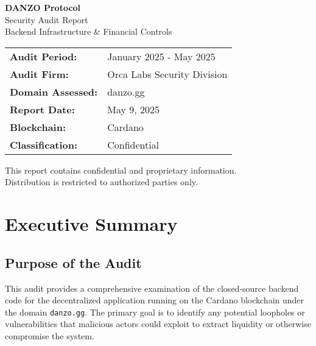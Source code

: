 \documentclass[11pt,a4paper]{article}
\begin{document}
\begin{titlepage}
    \centering
    \vspace*{2cm}
    
    {\Huge\bfseries\color{danzoBlue} DANZO Protocol}\\[0.5cm]
    {\LARGE\color{danzoGray} Security Audit Report}\\[2cm]
    
    {\Large Backend Infrastructure \& Financial Controls}\\[1cm]
    
    \begin{tabular}{ll}
        \textbf{Audit Period:} & January 2025 - May 2025 \\
        \textbf{Audit Firm:} & Orca Labs Security Division \\
        \textbf{Domain Assessed:} & danzo.gg \\
        \textbf{Report Date:} & May 9, 2025 \\
        \textbf{Blockchain:} & Cardano \\
        \textbf{Classification:} & Confidential \\
    \end{tabular}
    
    \vfill
    
    {\large\textcolor{danzoGray}{
        This report contains confidential and proprietary information.\\
        Distribution is restricted to authorized parties only.
    }}
    
\end{titlepage}

\tableofcontents
\newpage

\section{Executive Summary}

\subsection{Purpose of the Audit}
This audit provides a comprehensive examination of the closed-source backend code for the decentralized application running on the Cardano blockchain under the domain \texttt{danzo.gg}. The primary goal is to identify any potential loopholes or vulnerabilities that malicious actors could exploit to extract liquidity or otherwise compromise the system.
\end{document}
